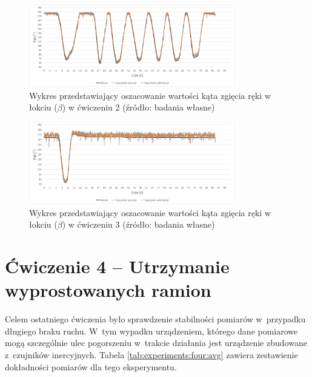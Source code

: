 	\begin{figure}[!htb]
		\centering
		\includegraphics[width=0.8\textwidth]{images/200/angle.png}
		\caption{Wykres przedstawiający oszacowanie wartości kąta zgięcia ręki w łokciu ($\beta$) w ćwiczeniu 2 (źródło: badania własne)}
		\label{fig:experiments:second:angle}
	\end{figure}
	\begin{figure}[!htb]
		\centering
		\includegraphics[width=0.8\textwidth]{images/300/angle.png}
		\caption{Wykres przedstawiający oszacowanie wartości kąta zgięcia ręki w łokciu ($\beta$) w ćwiczeniu 3  (źródło: badania własne)}
		\label{fig:experiments:third:angle}
	\end{figure}
																				
\section*{Ćwiczenie 4 -- Utrzymanie wyprostowanych ramion}
Celem ostatniego ćwiczenia było sprawdzenie stabilności pomiarów w~przypadku długiego braku ruchu. W~tym wypadku urządzeniem, którego dane pomiarowe mogą szczególnie ulec pogorszeniu w~trakcie działania jest urządzenie zbudowane z~czujników inercyjnych. Tabela \ref{tab:experiments:four:avg} zawiera zestawienie dokładności pomiarów dla tego eksperymentu.
																				
